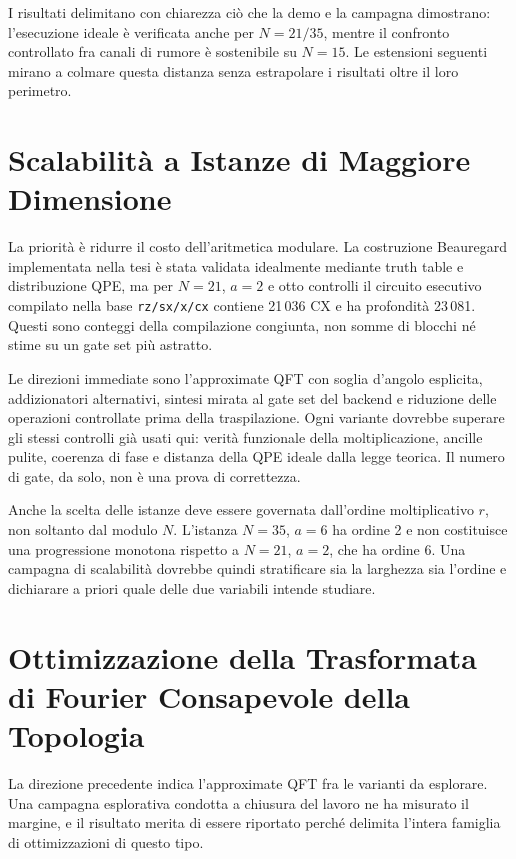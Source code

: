 \begin{onehalfspace}

I risultati delimitano con chiarezza ciò che la demo e la campagna
dimostrano: l'esecuzione ideale è verificata anche per $N=21/35$, mentre
il confronto controllato fra canali di rumore è sostenibile su $N=15$.
Le estensioni seguenti mirano a colmare questa distanza senza
estrapolare i risultati oltre il loro perimetro.

\section{Scalabilità a Istanze di Maggiore Dimensione}
\label{sec:scalabilita_futura}

La priorità è ridurre il costo dell'aritmetica modulare. La costruzione
Beauregard implementata nella tesi è stata validata idealmente mediante
truth table e distribuzione QPE, ma per $N=21$, $a=2$ e otto controlli il
circuito esecutivo compilato nella base \texttt{rz/sx/x/cx} contiene
21\,036 CX e ha profondità 23\,081. Questi sono conteggi della
compilazione congiunta, non somme di blocchi né stime su un gate set più
astratto.

Le direzioni immediate sono l'approximate QFT con soglia d'angolo
esplicita, addizionatori alternativi, sintesi mirata al gate set del
backend e riduzione delle operazioni controllate prima della
traspilazione. Ogni variante dovrebbe superare gli stessi controlli già
usati qui: verità funzionale della moltiplicazione, ancille pulite,
coerenza di fase e distanza della QPE ideale dalla legge teorica. Il
numero di gate, da solo, non è una prova di correttezza.

Anche la scelta delle istanze deve essere governata dall'ordine
moltiplicativo $r$, non soltanto dal modulo $N$. L'istanza $N=35$, $a=6$
ha ordine 2 e non costituisce una progressione monotona rispetto a
$N=21$, $a=2$, che ha ordine 6. Una campagna di scalabilità dovrebbe
quindi stratificare sia la larghezza sia l'ordine e dichiarare a priori
quale delle due variabili intende studiare.

\section{Ottimizzazione della Trasformata di Fourier Consapevole della Topologia}
\label{sec:qft_topologia}

La direzione precedente indica l'approximate QFT fra le varianti da esplorare.
Una campagna esplorativa condotta a chiusura del lavoro ne ha misurato il margine, e il
risultato merita di essere riportato perché delimita l'intera famiglia di ottimizzazioni
di questo tipo.


\end{onehalfspace}
